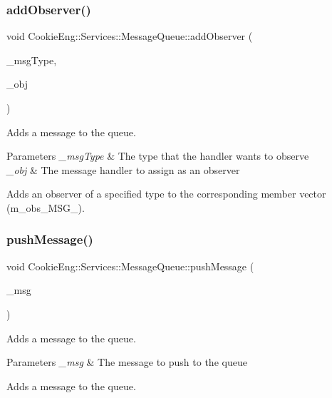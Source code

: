 \subsubsection{\texorpdfstring{add\+Observer()}{addObserver()}}
{\footnotesize\ttfamily void Cookie\+Eng\+::\+Services\+::\+Message\+Queue\+::add\+Observer (\begin{DoxyParamCaption}\item[{const Messaging\+::\+Message\+Type}]{\+\_\+msg\+Type,  }\item[{\hyperlink{class_cookie_eng_1_1_messaging_1_1_i_message_handler}{Messaging\+::\+I\+Message\+Handler} $\ast$}]{\+\_\+obj }\end{DoxyParamCaption})}



Adds a message to the queue. 


\begin{DoxyParams}{Parameters}
{\em \+\_\+msg\+Type} & The type that the handler wants to observe \\
\hline
{\em \+\_\+obj} & The message handler to assign as an observer\\
\hline
\end{DoxyParams}
Adds an observer of a specified type to the corresponding member vector (m\+\_\+obs\+\_\+\+M\+S\+G\+\_\+). \mbox{\label{class_cookie_eng_1_1_services_1_1_message_queue_aa8e385cf13d310d88f97053897e4970e}} 
\subsubsection{\texorpdfstring{push\+Message()}{pushMessage()}}
{\footnotesize\ttfamily void Cookie\+Eng\+::\+Services\+::\+Message\+Queue\+::push\+Message (\begin{DoxyParamCaption}\item[{const \hyperlink{class_cookie_eng_1_1_messaging_1_1_message}{Messaging\+::\+Message} \&}]{\+\_\+msg }\end{DoxyParamCaption})}



Adds a message to the queue. 


\begin{DoxyParams}{Parameters}
{\em \+\_\+msg} & The message to push to the queue\\
\hline
\end{DoxyParams}
Adds a message to the queue. \mbox{\label{class_cookie_eng_1_1_services_1_1_message_queue_ab21464c42066c511f5e9284a24113ad9}} 
